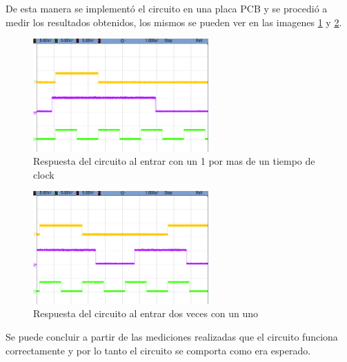 %
De esta manera se implementó el circuito en una placa PCB y se procedió a medir los resultados obtenidos, los mismos se pueden ver en las imagenes \ref{ej3_res1} y \ref{ej3_res2}.
%
\begin{figure}[H]
    \centering
    \includegraphics[width=0.6\textwidth]{figs/Ej3/scope_19.png} %
        \caption{Respuesta del circuito al entrar con un 1 por mas de un tiempo de clock}
    \label{ej3_res1}
\end{figure}
%
%
\begin{figure}[H]
    \centering
    \includegraphics[width=0.6\textwidth]{figs/Ej3/scope_20.png} %
        \caption{Respuesta del circuito al entrar dos veces con un uno}
    \label{ej3_res2}
\end{figure}
%
Se puede concluir a partir de las mediciones realizadas que el circuito funciona correctamente y por lo tanto el circuito se comporta como era esperado.